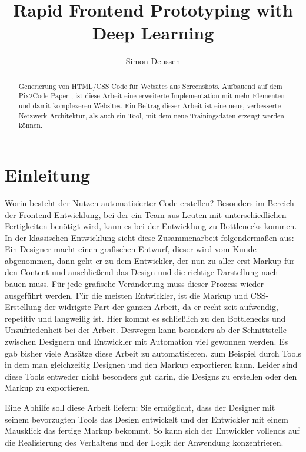 \documentclass[pdftex,a4paper,halfparskip, article]{scrartcl}
\title{Rapid Frontend Prototyping with Deep Learning} %
\author{Simon Deussen}	%
\begin{document}
\maketitle	

\begin{abstract}
Generierung von HTML/CSS Code für Websites aus Screenshots. Aufbauend auf dem Pix2Code Paper \cite{Beltramelli17}, ist diese Arbeit eine erweiterte Implementation mit mehr Elementen und damit komplexeren Websites. Ein Beitrag dieser Arbeit ist eine neue, verbesserte Netzwerk Architektur, als auch ein Tool, mit dem neue Trainingsdaten erzeugt werden können.
\end{abstract}


\tableofcontents	%
\section{Einleitung} 

Worin besteht der Nutzen automatisierter Code erstellen? Besonders im Bereich der Frontend-Entwicklung, bei der ein Team aus Leuten mit unterschiedlichen Fertigkeiten benötigt wird, kann es bei der Entwicklung zu Bottlenecks kommen. In der klassischen Entwicklung sieht diese Zusammenarbeit folgendermaßen aus: \\
Ein Designer macht einen grafischen Entwurf, dieser wird vom Kunde abgenommen, dann geht er zu dem Entwickler, der nun zu aller erst Markup für den Content und anschließend das Design und die richtige Darstellung nach bauen muss. Für jede grafische Veränderung muss dieser Prozess wieder ausgeführt werden. Für die meisten Entwickler, ist die Markup und CSS-Erstellung der widrigste Part der ganzen Arbeit, da er recht zeit-aufwendig, repetitiv und langweilig ist.
Hier kommt es schließlich zu den Bottlenecks und Unzufriedenheit bei der Arbeit. Deswegen kann besonders ab der Schnittstelle zwischen Designern und Entwickler mit Automation viel gewonnen werden. Es gab bisher viele Ansätze diese Arbeit zu automatisieren, zum Beispiel durch Tools in dem man gleichzeitig Designen und den Markup exportieren kann. Leider sind diese Tools entweder nicht besonders gut darin, die Designs zu erstellen oder den Markup zu exportieren.

Eine Abhilfe soll diese Arbeit liefern: Sie ermöglicht, dass der Designer mit seinem bevorzugten Tools das Design entwickelt und der Entwickler mit einem Mausklick das fertige Markup bekommt. So kann sich der Entwickler vollends auf die Realisierung des Verhaltens und der Logik der Anwendung konzentrieren. 
\end{document}
